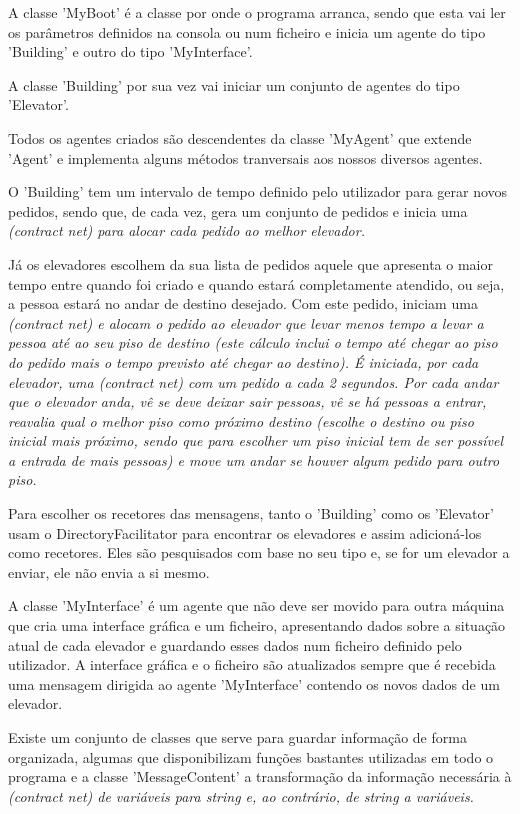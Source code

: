 \documentclass[a4paper]{article}
\begin{document}
A classe 'MyBoot' é a classe por onde o programa arranca, sendo que esta vai ler os parâmetros definidos na consola ou num ficheiro e inicia um agente do tipo 'Building' e outro do tipo 'MyInterface'.

A classe 'Building' por sua vez vai iniciar um conjunto de agentes do tipo 'Elevator'.

Todos os agentes criados são descendentes da classe 'MyAgent' que extende 'Agent' e implementa alguns métodos tranversais aos nossos diversos agentes.

O 'Building' tem um intervalo de tempo definido pelo utilizador para gerar novos pedidos, sendo que, de cada vez, gera um conjunto de pedidos e inicia uma \itshape(contract net) para alocar cada pedido ao melhor elevador.

Já os elevadores escolhem da sua lista de pedidos aquele que apresenta o maior tempo entre quando foi criado e quando estará completamente atendido, ou seja, a pessoa estará no andar de destino desejado. Com este pedido, iniciam uma \itshape(contract net) e alocam o pedido ao elevador que levar menos tempo a levar a pessoa até ao seu piso de destino (este cálculo inclui o tempo até chegar ao piso do pedido mais o tempo previsto até chegar ao destino). É iniciada, por cada elevador, uma \itshape(contract net) com um pedido a cada 2 segundos. Por cada andar que o elevador anda, vê se deve deixar sair pessoas, vê se há pessoas a entrar, reavalia qual o melhor piso como próximo destino (escolhe o destino ou piso inicial mais próximo, sendo que para escolher um piso inicial tem de ser possível a entrada de mais pessoas) e move um andar se houver algum pedido para outro piso.

Para escolher os recetores das mensagens, tanto o 'Building' como os 'Elevator' usam o DirectoryFacilitator para encontrar os elevadores e assim adicioná-los como recetores. Eles são pesquisados com base no seu tipo e, se for um elevador a enviar, ele não envia a si mesmo.

A classe 'MyInterface' é um agente que não deve ser movido para outra máquina que cria uma interface gráfica e um ficheiro, apresentando dados sobre a situação atual de cada elevador e guardando esses dados num ficheiro definido pelo utilizador. A interface gráfica e o ficheiro são atualizados sempre que é recebida uma mensagem dirigida ao agente 'MyInterface' contendo os novos dados de um elevador.

Existe um conjunto de classes que serve para guardar informação de forma organizada, algumas que disponibilizam funções bastantes utilizadas em todo o programa e a classe 'MessageContent' a transformação da informação necessária à \itshape(contract net) de variáveis para string e, ao contrário, de string a variáveis.
\end{document}
